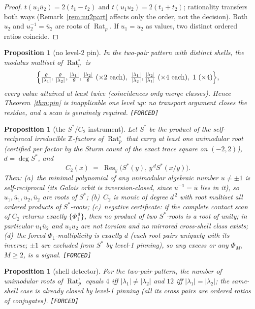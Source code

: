 \documentclass[11pt]{article}
\newcommand{\F}{\textnormal{\texttt{[FORCED]}}}
\newcommand{\Z}{\mathbb{Z}}
\newcommand{\Rat}{\operatorname{Rat}}
\newcommand{\Res}{\operatorname{Res}}
\newtheorem{proposition}[theorem]{Proposition}
\theoremstyle{definition}
\begin{document}
\begin{proof}
$t(u_1\bar u_2)=2(t_1-t_2)$ and $t(u_1u_2)=2(t_1+t_2)$; rationality transfers
both ways (Remark~\ref{rem:nu2part} affects only the order, not the decision).
Both $u_2$ and $u_2^{-1}=\bar u_2$ are roots of $\Rat_p$. If $u_1=u_2$ as
values, two distinct ordered ratios coincide.
\end{proof}

\begin{proposition}[no level-2 pin]\label{prop:nopin}
In the two-pair pattern with distinct shells, the modulus multiset of
$\Rat_p^{\circ}$ is
\[
\Bigl\{\tfrac{\theta}{|\lambda_1|},\tfrac{\theta}{|\lambda_2|},
\tfrac{|\lambda_1|}{\theta},\tfrac{|\lambda_2|}{\theta}\ (\times2\ \text{each}),\
\tfrac{|\lambda_1|}{|\lambda_2|},\tfrac{|\lambda_2|}{|\lambda_1|}\ (\times4\ \text{each}),\
1\ (\times4)\Bigr\},
\]
every value attained at least twice (coincidences only merge classes). Hence
Theorem~\ref{thm:pin} is inapplicable one level up: no transport argument closes
the residue, and a scan is genuinely required. \F
\end{proposition}

\begin{proposition}[the $S^{*}/C_2$ instrument]\label{prop:c2}
Let $S^{*}$ be the product of the self-reciprocal irreducible $\Z$-factors of
$\Rat_p^{\circ}$ that carry at least one unimodular root (certified per factor
by the Sturm count of the exact trace square on $(-2,2)$), $d=\deg S^{*}$, and
\[
C_2(x)\;=\;\Res_y\bigl(S^{*}(y),\,y^{\,d}S^{*}(x/y)\bigr).
\]
Then: (a)~the minimal polynomial of any unimodular algebraic number $u\neq\pm1$
is self-reciprocal (its Galois orbit is inversion-closed, since
$u^{-1}=\bar u$ lies in it), so $u_1,\bar u_1,u_2,\bar u_2$ are roots of
$S^{*}$; (b)~$C_2$ is monic of degree $d^{\,2}$ with root multiset all ordered
products of $S^{*}$-roots; (c)~\emph{negative certificate}: if the complete
contact scan of $C_2$ returns exactly $\{\Phi_1^{\,d}\}$, then no product of two
$S^{*}$-roots is a root of unity; in particular $u_1\bar u_2$ and $u_1u_2$ are
not torsion and no mirrored cross-shell class exists; (d)~the forced
$\Phi_1$-multiplicity is exactly $d$ (each root pairs uniquely with its inverse;
$\pm1$ are excluded from $S^{*}$ by level-1 pinning), so any excess or any
$\Phi_M$, $M\ge2$, is a signal. \F
\end{proposition}

\begin{proposition}[shell detector]\label{prop:shells}
For the two-pair pattern, the number of unimodular roots of $\Rat_p^{\circ}$
equals $4$ iff $|\lambda_1|\neq|\lambda_2|$ and $12$ iff
$|\lambda_1|=|\lambda_2|$; the same-shell case is already closed by level-1
pinning (all its cross pairs are ordered ratios of conjugates). \F
\end{proposition}
\end{document}
